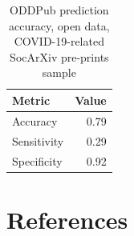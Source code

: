 \documentclass[
]{article}
\begin{document}
\begin{table}

\caption{\label{tab:accuracy-2020}ODDPub prediction accuracy, open data, COVID-19-related SocArXiv pre-prints sample}
\centering
\begin{tabular}[t]{l|r}
\hline
Metric & Value\\
\hline
Accuracy & 0.79\\
\hline
Sensitivity & 0.29\\
\hline
Specificity & 0.92\\
\hline
\end{tabular}
\end{table}

\newpage

\hypertarget{references}{%
\section*{References}\label{references}}
\end{document}

